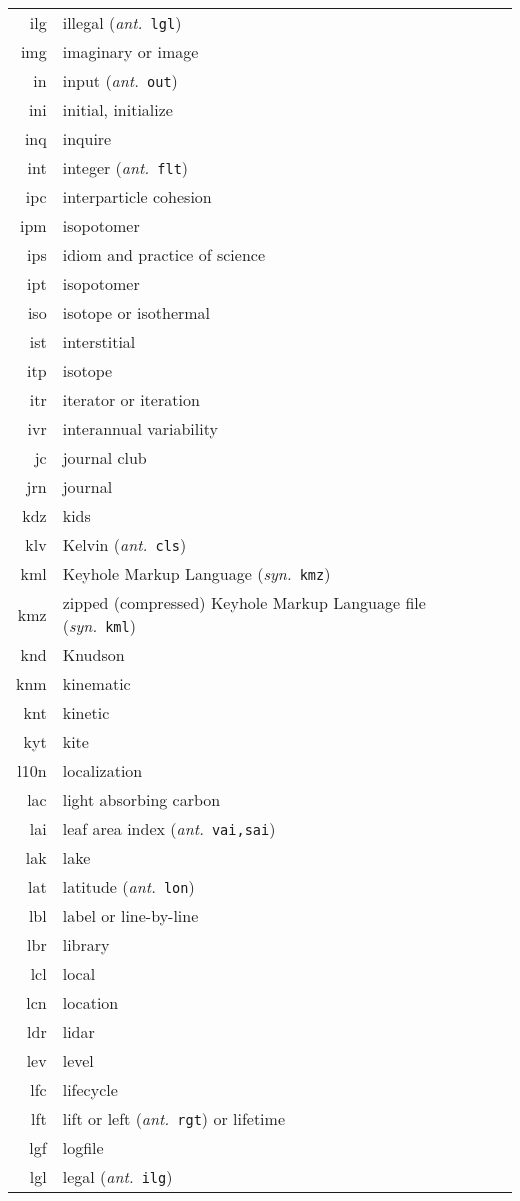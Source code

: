 \documentclass[12pt,twoside]{article}
\newcommand{\ant}[1]{(\textit{ant.}~\texttt{#1})}
\newcommand{\syn}[1]{(\textit{syn.}~\texttt{#1})}
\begin{document}
\begin{longtable}[>{\bfseries}l]{>{\ttfamily}r l}
ilg & illegal \ant{lgl} \\
img & imaginary or image \\
in & input \ant{out} \\
ini & initial, initialize \\
inq & inquire \\
int & integer \ant{flt} \\
ipc & interparticle cohesion \\
ipm & isopotomer \\
ips & idiom and practice of science \\
ipt & isopotomer \\
iso & isotope or isothermal \\
ist & interstitial \\
itp & isotope \\
itr & iterator or iteration \\
ivr & interannual variability \\
jc & journal club \\
jrn & journal \\
kdz & kids \\
klv & Kelvin \ant{cls} \\
kml & Keyhole Markup Language \syn{kmz} \\
kmz & zipped (compressed) Keyhole Markup Language file \syn{kml} \\
knd & Knudson \\
knm & kinematic \\
knt & kinetic \\
kyt & kite \\
l10n & localization \\
lac & light absorbing carbon \\
lai & leaf area index \ant{vai,sai} \\
lak & lake \\
lat & latitude \ant{lon} \\
lbl & label or line-by-line \\
lbr & library \\
lcl & local \\
lcn & location \\
ldr & lidar \\
lev & level \\
lfc & lifecycle \\
lft & lift or left \ant{rgt} or lifetime \\
lgf & logfile \\
lgl & legal \ant{ilg} \\

\end{longtable}
\end{document}
